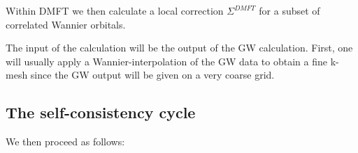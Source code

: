 \documentclass[12pt,a4paper]{scrartcl}
\numberwithin{equation}{section}
\newcommand{\GF}{Green's function}
\newcommand{\unity}{\mathds{1}}
\begin{document}
Within DMFT we then calculate a local correction $\Sigma^{DMFT}$ for a subset of correlated
Wannier orbitals.

The input of the calculation will be the output of the GW calculation. First, one will usually apply a Wannier-interpolation of the GW data to obtain a fine k-mesh
since the GW output will be given on a very coarse grid.

\subsection{The self-consistency cycle}
\label{sec:gwdmft_cycle}

We then proceed as follows:

\begin{enumerate}




% 


\end{enumerate}
\end{document}
